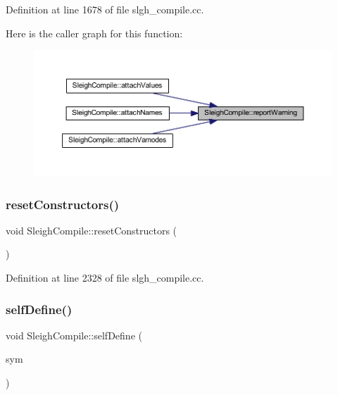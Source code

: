 Definition at line 1678 of file slgh\+\_\+compile.\+cc.

Here is the caller graph for this function\+:
\nopagebreak
\begin{figure}[H]
\begin{center}
\leavevmode
\includegraphics[width=350pt]{class_sleigh_compile_af7bc0abd8fab8c9ec3feef83fa14cd54_icgraph}
\end{center}
\end{figure}
\mbox{\label{class_sleigh_compile_a95789f902da8678b1ef5fa019b1733ec}} 
\subsubsection{\texorpdfstring{resetConstructors()}{resetConstructors()}}
{\footnotesize\ttfamily void Sleigh\+Compile\+::reset\+Constructors (\begin{DoxyParamCaption}\item[{void}]{ }\end{DoxyParamCaption})}



Definition at line 2328 of file slgh\+\_\+compile.\+cc.

\mbox{\label{class_sleigh_compile_a506e372776432e6ba9d06ccf0402bfa9}} 
\subsubsection{\texorpdfstring{selfDefine()}{selfDefine()}}
{\footnotesize\ttfamily void Sleigh\+Compile\+::self\+Define (\begin{DoxyParamCaption}\item[{\mbox{\hyperlink{class_operand_symbol}{Operand\+Symbol}} $\ast$}]{sym }\end{DoxyParamCaption})}



